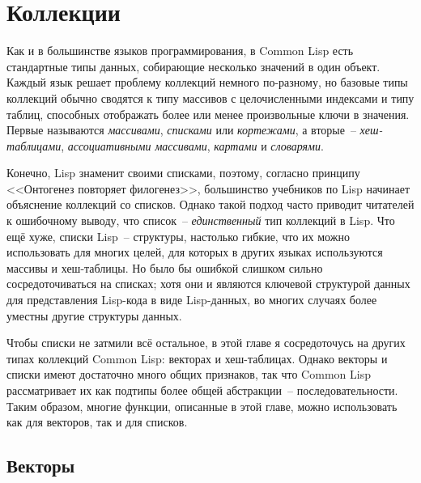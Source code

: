\chapter{Коллекции}
\label{ch:11}

\thispagestyle{empty}

Как и в большинстве языков программирования, в Common Lisp есть стандартные типы данных,
собирающие несколько значений в один объект.  Каждый язык решает проблему коллекций
немного по-разному, но базовые типы коллекций обычно сводятся к типу массивов с целочисленными
индексами и типу таблиц, способных отображать более или менее
произвольные ключи в значения.  Первые называются \textit{массивами}, \textit{списками} или \textit{кортежами}, а
вторые~-- \textit{хеш-таблицами}, \textit{ассоциативными массивами}, \textit{картами} и \textit{словарями}.

Конечно, Lisp знаменит своими списками, поэтому, согласно принципу <<Онтогенез повторяет
филогенез>>, большинство учебников по Lisp начинает объяснение коллекций со
списков. Однако такой подход часто приводит читателей к ошибочному выводу, что
список~-- \textit{единственный} тип коллекций в Lisp.  Что ещё хуже,
списки Lisp~-- структуры, настолько гибкие, что их можно использовать для многих целей, для
которых в других языках используются массивы и хеш-таблицы.  Но было бы ошибкой слишком
сильно сосредоточиваться на списках; хотя они и являются ключевой структурой данных для
представления Lisp-кода в виде Lisp-данных, во многих случаях более уместны другие структуры данных.

Чтобы списки не затмили всё остальное, в этой главе я сосредоточусь на других типах
коллекций Common Lisp: векторах и хеш-таблицах.
Однако векторы и списки имеют достаточно много общих признаков, так что Common Lisp
рассматривает их как подтипы более общей абстракции~-- последовательности.  Таким образом,
многие функции, описанные в этой главе, можно использовать как для векторов, так и для
списков.

\section{Векторы}

